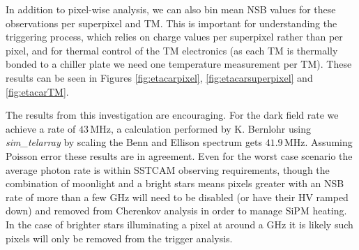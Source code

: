 In addition to pixel-wise analysis, we can also bin mean NSB values for these observations per superpixel and TM. This is important for understanding the triggering process, which relies on charge values per superpixel rather than per pixel, and for thermal control of the TM electronics (as each TM is thermally bonded to a chiller plate we need one temperature measurement per TM). These results can be seen in Figures \ref{fig:etacarpixel}, \ref{fig:etacarsuperpixel} and \ref{fig:etacarTM}.

The results from this investigation are encouraging. For the dark field rate we achieve a rate of $\mathrm{43\,MHz}$, a calculation performed by K. Bernlohr using \textit{sim\_telarray} by scaling the Benn and Ellison spectrum \cite{BandE} gets $\mathrm{41.9\,MHz}$. Assuming Poisson error these results are in agreement. Even for the worst case scenario the average photon rate is within SSTCAM observing requirements, though the combination of moonlight and a bright stars means pixels greater with an NSB rate of more than a few GHz will need to be disabled (or have their HV ramped down) and removed from Cherenkov analysis in order to manage SiPM heating. In the case of brighter stars illuminating a pixel at around a GHz it is likely such pixels will only be removed from the trigger analysis.
\begin{table}[h]
    \centering
    \caption{Observation parameters for the four Eta Carinae Runs.  The observing Altitude (ALT) and Azimuth (AZ) are presented, along with the simulated source Right Ascension (RA) and Declination (DEC). The moonlit Eta Carinae runs are at a low altitude that an IACT would not normally observe at, but since the \textit{nsb} model does not contain a full atmospheric model this is inconsequential. Times are in UTC.}
    \label{tab:etacar_params}
\end{table}

